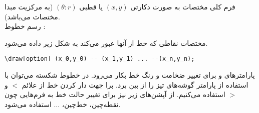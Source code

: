 \documentclass{article}
\begin{document}
فرم کلی مختصات به صورت دکارتی $(x,y)$ یا قطبی $(\theta: r)$  (به مرکزیت مبدا مختصات می‌باشد).\\

رسم خطوط :

  مختصات نقاطی که خط از آنها عبور می‌کند  به شکل زیر داده می‌شود.
\begin{latin}\begin{verbatim}
\draw[option] (x_0,y_0) -- (x_1,y_1) ... --(x_n,y_n);
\end{verbatim}\end{latin}
پارامتر‌های 
 و 
  برای تغییر ضخامت و رنگ خط بکار می‌رود. در خطوط شکسته می‌توان با استفاده از پارامتر
 گوشه‌های تیز را از بین برد. برا جهت دار کردن خط از علائم $<$ و $>$ استفاده می‌کنیم. از آپشن‌های زیر نیز  برای تغییر حالت خط به فرم‌هایی چون 
 نقطه‌چین، خط‌چین، $\ldots$   استفاده می‌شود.
 
\end{document}
